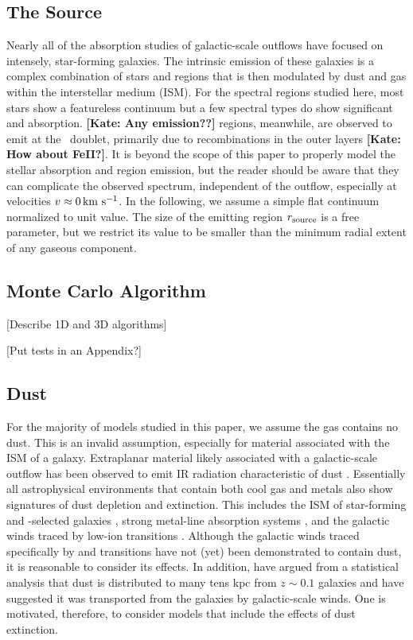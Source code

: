 \documentclass[12pt,preprint]{aastex}
\begin{document}
\subsection{The Source}

Nearly all of the absorption studies of galactic-scale outflows 
have focused on intensely, star-forming galaxies.  The
intrinsic emission of these galaxies is a complex combination of
stars and  regions that is then modulated by dust and gas
within the interstellar medium (ISM).  For the spectral regions studied
here, most stars show a featureless continuum but a few spectral
types do show significant  and  absorption.
{\bf [Kate: Any emission??]}   regions, meanwhile, are observed to emit
at the \mgiid\ doublet, primarily due to recombinations in the outer
layers {\bf [Kate: How about FeII?]}.  It is beyond the scope of this paper to
properly model the 
stellar absorption and  region emission, but the reader
should be aware that they can complicate the observed spectrum,
independent of the outflow, especially at velocities $v \approx 0 \, {\rm km~s^{-1}}$.
In the following, we assume a simple flat continuum 
normalized to unit value.  The size of the emitting
region $r_{\rm source}$ is a free parameter, but we restrict its value
to be smaller than the minimum radial extent of any gaseous
component. 


\subsection{Monte Carlo Algorithm}

[Describe 1D and 3D algorithms]

[Put tests in an Appendix?]

\subsection{Dust}
\label{sec:dust_method}

For the majority of models studied in this paper, we assume the gas
contains no dust.
This is an invalid assumption, especially for material associated with
the ISM of a galaxy.  
Extraplanar material likely associated with a galactic-scale 
outflow has been observed to emit IR radiation characteristic of dust \citep[e.g.][]{M87_dust}.
Essentially all astrophysical environments that contain both cool gas
and metals also show signatures of dust depletion and extinction.  This includes the
ISM of star-forming and -selected galaxies
\citep[e.g.][]{ss96,pw01,pcd+07}, strong  metal-line
absorption systems \citep{ykv+06,mnt+08}, and the galactic winds traced
by low-ion transitions \citep{prs+02,rvs05b}.  Although the galactic winds
traced specifically by  and  transitions have not (yet) been
demonstrated to contain dust, it is reasonable to consider its
effects.
In addition, \cite{msf+10} have argued from a statistical analysis
that dust is distributed to many tens kpc from $z \sim 0.1$ galaxies
and have suggested it was transported from the galaxies by
galactic-scale winds.  One is motivated, therefore, to consider
models that include the effects of dust extinction.
\end{document}
